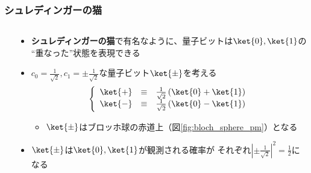 \begin{frame}
  \frametitle{シュレディンガーの猫}

  \begin{columns}
    \begin{column}{0.4\textwidth}
    \end{column}
    \begin{column}{0.6\textwidth}
      \begin{itemize}
        \item<+-> \textbf{シュレディンガーの猫}で有名なように、量子ビットは$\ket{0}, \ket{1}$の
        ``重なった''状態を表現できる

        \item<+-> $c_0 = \frac{1}{\sqrt{2}}, c_1 = \pm\frac{1}{\sqrt{2}}$な量子ビット$\ket{\pm}$を考える
        \begin{align*}
          \left\{\begin{array}{lcl}
            \ket{+} &\equiv& \frac{1}{\sqrt{2}}\left(\ket{0} + \ket{1}\right) \\
            \ket{-} &\equiv& \frac{1}{\sqrt{2}}\left(\ket{0} - \ket{1}\right)
          \end{array}\right.
        \end{align*}
        \begin{itemize}
          \item $\ket{\pm}$はブロッホ球の赤道上（図\ref{fig:bloch_sphere_pm}）となる
        \end{itemize}

        \item<+-> $\ket{\pm}$は$\ket{0}, \ket{1}$が観測される確率が
        それぞれ$\left|\pm\frac{1}{\sqrt{2}}\right|^2 = \frac{1}{2}$になる
      \end{itemize}
    \end{column}
  \end{columns}
\end{frame}

